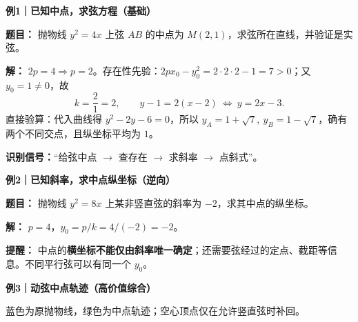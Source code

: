 \clearpage
\begin{examplebox}
\par\medskip
\begin{minipage}{\linewidth}
\noindent
\textbf{\textcolor{CExample}{例1｜已知中点，求弦方程（基础）}}\par\nobreak\smallskip
\par\noindent\textbf{题目：} 抛物线 $y^2=4x$ 上弦 $AB$ 的中点为 $M(2,1)$，求弦所在直线，并验证是实弦。
\par
\end{minipage}
\par\smallskip
\par\noindent\textbf{解：} $2p=4\Rightarrow p=2$。存在性先验：$2px_0-y_0^2=2\cdot2\cdot2-1=7>0$；又 $y_0=1\ne0$，故
\[
 k=\frac{2}{1}=2,\qquad
 \boxed{y-1=2(x-2)\ \Longleftrightarrow\ y=2x-3}.
\]
直接验算：代入曲线得 $y^2-2y-6=0$，所以 $y_A=1+\sqrt7,\ y_B=1-\sqrt7$，确有两个不同交点，且纵坐标平均为 $1$。
\par\noindent\textbf{识别信号：}“给弦中点 $\to$ 查存在 $\to$ 求斜率 $\to$ 点斜式”。
\par\medskip
\begin{minipage}{\linewidth}
\noindent
\textbf{\textcolor{CExample}{例2｜已知斜率，求中点纵坐标（逆向）}}\par\nobreak\smallskip
\par\noindent\textbf{题目：} 抛物线 $y^2=8x$ 上某非竖直弦的斜率为 $-2$，求其中点的纵坐标。
\par
\end{minipage}
\par\smallskip
\par\noindent\textbf{解：} $p=4$，$y_0=p/k=4/(-2)=\boxed{-2}$。
\par\noindent\textbf{提醒：} 中点的\textbf{横坐标不能仅由斜率唯一确定}；还需要弦经过的定点、截距等信息。不同平行弦可以有同一个 $y_0$。
\par\medskip
\begin{minipage}{\linewidth}
\noindent
\textbf{\textcolor{CExample}{例3｜动弦中点轨迹（高价值综合）}}\par\nobreak\smallskip

\par
\begin{minipage}{\linewidth}
\begin{center}

\par\small 蓝色为原抛物线，绿色为中点轨迹；空心顶点仅在允许竖直弦时补回。
\end{center}
\end{minipage}
\par


\end{minipage}
\end{examplebox}
